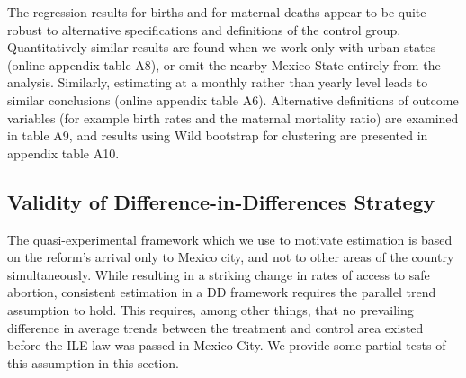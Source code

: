 \documentclass[a4paper, 11pt]{article}
\begin{document}
\begin{spacing}{2}
The regression results for births and for maternal deaths appear to be quite robust to alternative specifications and definitions of the control group.  Quantitatively similar results are found when we work only with urban states (online appendix table A8), or omit the nearby Mexico State entirely from the analysis.  Similarly, estimating at a monthly rather than yearly level leads to similar conclusions (online appendix table A6).  Alternative definitions of outcome variables (for example birth rates and the maternal mortality ratio) are examined in table A9, and results using Wild bootstrap for clustering are presented in appendix table A10.



\subsection{Validity of Difference-in-Differences Strategy}\label{parallel}
The quasi-experimental framework which we use to motivate estimation is based on the reform's arrival only to Mexico city, and not to other areas of the country simultaneously.  While resulting in a striking change in rates of access to safe abortion, consistent estimation in a DD framework requires the parallel trend assumption to hold.  This requires, among other things, that no prevailing difference in average trends between the treatment and control area existed before the ILE law was passed in Mexico City. We provide some partial tests of this assumption in this section.


\end{spacing}
\end{document}
